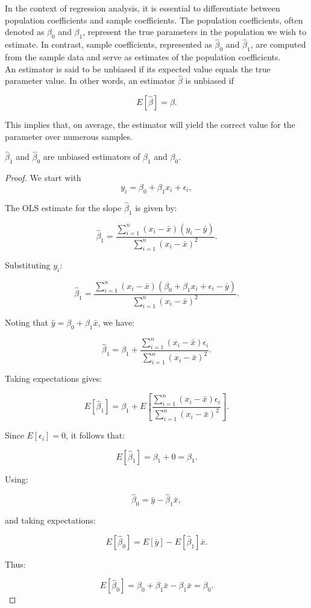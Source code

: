 In the context of regression analysis, it is essential to differentiate between population coefficients and sample coefficients. The population coefficients, often denoted as \(\beta_0\) and \(\beta_1\), represent the true parameters in the population we wish to estimate. In contrast, sample coefficients, represented as \(\hat{\beta}_0\) and \(\hat{\beta}_1\), are computed from the sample data and serve as estimates of the population coefficients.\\

An estimator is said to be unbiased if its expected value equals the true parameter value. In other words, an estimator \(\hat{\beta}\) is unbiased if 

\[
E[\hat{\beta}] = \beta.
\]

This implies that, on average, the estimator will yield the correct value for the parameter over numerous samples. \\

\begin{theorem}
    $\hat{\beta}_1$ and $\hat{\beta}_0$ are unbiased estimators of $\beta_1$ and $\beta_0$.
\end{theorem}

\begin{proof}
    We start with 
    \[
y_i = \beta_0 + \beta_1 x_i + \epsilon_i,
\]

The OLS estimate for the slope \(\hat{\beta}_1\) is given by:

\[
\hat{\beta}_1 = \frac{\sum_{i=1}^n (x_i - \bar{x})(y_i - \bar{y})}{\sum_{i=1}^n (x_i - \bar{x})^2}.
\]

Substituting \(y_i\):

\[
\hat{\beta}_1 = \frac{\sum_{i=1}^n (x_i - \bar{x})\left(\beta_0 + \beta_1 x_i + \epsilon_i - \bar{y}\right)}{\sum_{i=1}^n (x_i - \bar{x})^2}.
\]

Noting that \(\bar{y} = \beta_0 + \beta_1 \bar{x}\), we have:

\[
\hat{\beta}_1 = \beta_1 + \frac{\sum_{i=1}^n (x_i - \bar{x}) \epsilon_i}{\sum_{i=1}^n (x_i - \bar{x})^2}.
\]

Taking expectations gives:

\[
E[\hat{\beta}_1] = \beta_1 + E\left[\frac{\sum_{i=1}^n (x_i - \bar{x}) \epsilon_i}{\sum_{i=1}^n (x_i - \bar{x})^2}\right].
\]

Since \(E[\epsilon_i] = 0\), it follows that:

\[
E[\hat{\beta}_1] = \beta_1 + 0 = \beta_1.
\]

Using:

\[
\hat{\beta}_0 = \bar{y} - \hat{\beta}_1 \bar{x},
\]

and taking expectations:

\[
E[\hat{\beta}_0] = E[\bar{y}] - E[\hat{\beta}_1] \bar{x}.
\]

Thus:

\[
E[\hat{\beta}_0] = \beta_0 + \beta_1 \bar{x} - \beta_1 \bar{x} = \beta_0.
\]
\end{proof}


